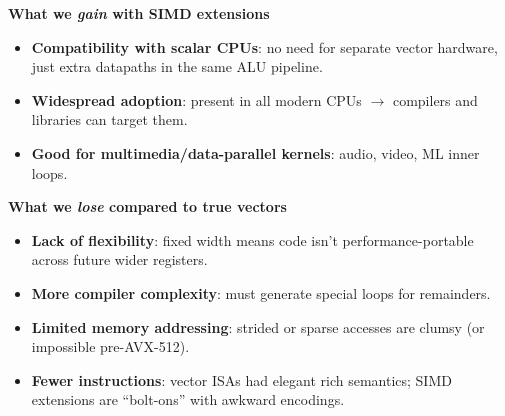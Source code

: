 \newpage

\begin{flushleft}
    \textcolor{Green3}{ \textbf{What we \emph{gain} with SIMD extensions}}
\end{flushleft}
\begin{itemize}
    \item[\textcolor{Green3}{\faIcon{check}}] \textcolor{Green3}{\textbf{Compatibility with scalar CPUs}}: no need for separate vector hardware, just extra datapaths in the same ALU pipeline.
    \item[\textcolor{Green3}{\faIcon{check}}] \textcolor{Green3}{\textbf{Widespread adoption}}: present in all modern CPUs $\rightarrow$ compilers and libraries can target them.
    \item[\textcolor{Green3}{\faIcon{check}}] \textcolor{Green3}{\textbf{Good for multimedia/data-parallel kernels}}: audio, video, ML inner loops.
\end{itemize}

\highspace
\begin{flushleft}
    \textcolor{Red2}{ \textbf{What we \emph{lose} compared to true vectors}}
\end{flushleft}
\begin{itemize}
    \item[\textcolor{Red2}{\faIcon{times}}] \textcolor{Red2}{\textbf{Lack of flexibility}}: fixed width means code isn't performance-portable across future wider registers.
    \item[\textcolor{Red2}{\faIcon{times}}] \textcolor{Red2}{\textbf{More compiler complexity}}: must generate special loops for remainders.
    \item[\textcolor{Red2}{\faIcon{times}}] \textcolor{Red2}{\textbf{Limited memory addressing}}: strided or sparse accesses are clumsy (or impossible pre-AVX-512).
    \item[\textcolor{Red2}{\faIcon{times}}] \textcolor{Red2}{\textbf{Fewer instructions}}: vector ISAs had elegant rich semantics; SIMD extensions are ``bolt-ons'' with awkward encodings.
\end{itemize}